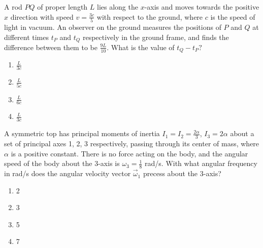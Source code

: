 \iffalse
\chapter{2023}
\author{ai24btech11035}
\section{ph}
\fi
\item A rod $PQ$ of proper length $L$ lies along the $x$-axis and moves towards the positive $x$ direction with speed $v = \frac{3c}{5}$ with respect to the ground, where $c$ is the speed of light in vacuum. An observer on the ground measures the positions of $P$ and $Q$ at different times $t_P$ and $t_Q$ respectively in the ground frame, and finds the difference between them to be $\frac{9L}{10}$. What is the value of $t_Q - t_P?$
\begin{figure}[H]
	\centering
\end{figure}
\begin{enumerate}
\item $\frac{L}{3c}$
\item $\frac{L}{5c}$
\item $\frac{L}{6c}$
\item $\frac{L}{3c}$
\end{enumerate}
\item A symmetric top has principal moments of inertia $I_1 = I_2 = \frac{2\alpha}{3}$, $I_3 = 2\alpha$ about a set of principal axes 1, 2, 3 respectively, passing through its center of mass, where $\alpha$ is a positive constant. There is no force acting on the body, and the angular speed of the body about the 3-axis is $\omega_3 = \frac{1}{8}$ rad/s. With what angular frequency in rad/s does the angular velocity vector $\vec{\omega}_1$ precess about the 3-axis?
\begin{enumerate}
\item 2
\item 3
\item 5
\item 7
\end{enumerate}
